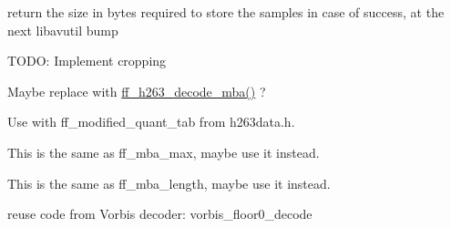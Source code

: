 
\begin{DoxyRefList}
\item[Member \mbox{\hyperlink{group__lavc__misc_ga66b44aad56fa22a78fb8916eb8cc0516}{avcodec\+\_\+fill\+\_\+audio\+\_\+frame}} (\mbox{\hyperlink{struct_a_v_frame}{A\+V\+Frame}} $\ast$frame, int nb\+\_\+channels, enum A\+V\+Sample\+Format sample\+\_\+fmt, const uint8\+\_\+t $\ast$buf, int buf\+\_\+size, int align)]\label{todo__todo000001}%
%
return the size in bytes required to store the samples in case of success, at the next libavutil bump  
\item[Member \mbox{\hyperlink{pgssubdec_8c_ad3cdafdb4e33460b2d08bef10abc42e0}{parse\+\_\+presentation\+\_\+segment}} (\mbox{\hyperlink{struct_a_v_codec_context}{A\+V\+Codec\+Context}} $\ast$avctx, const uint8\+\_\+t $\ast$buf, int buf\+\_\+size, int64\+\_\+t pts)]\label{todo__todo000002}%
%
T\+O\+DO\+: Implement cropping  
\item[Member \mbox{\hyperlink{rv34_8h_ad46c3fe33a6386b10a17c89a99503820}{ff\+\_\+rv34\+\_\+get\+\_\+start\+\_\+offset}} (\mbox{\hyperlink{struct_get_bit_context}{Get\+Bit\+Context}} $\ast$gb, int blocks)]\label{todo__todo000003}%
%
Maybe replace with \mbox{\hyperlink{h263_8h_a1eddcfd1eb8a27f9bc0edf7a227db7ea}{ff\+\_\+h263\+\_\+decode\+\_\+mba()}} ?  
\item[Member \mbox{\hyperlink{rv34data_8h_a86c4b6faa22c5ba0e3b16f3878bb8c33}{rv34\+\_\+dquant\+\_\+tab}} \mbox{[}2\mbox{]}\mbox{[}32\mbox{]}]\label{todo__todo000004}%
%
Use with ff\+\_\+modified\+\_\+quant\+\_\+tab from h263data.\+h.  
\item[Member \mbox{\hyperlink{rv34data_8h_add4342907e27f8b86afd06dcafe6a175}{rv34\+\_\+mb\+\_\+max\+\_\+sizes}} \mbox{[}6\mbox{]}]\label{todo__todo000005}%
%
This is the same as ff\+\_\+mba\+\_\+max, maybe use it instead.  
\item[Member \mbox{\hyperlink{rv34data_8h_ad329771d8171231707e603adea9767dc}{rv34\+\_\+mb\+\_\+bits\+\_\+sizes}} \mbox{[}6\mbox{]}]\label{todo__todo000006}%
%
This is the same as ff\+\_\+mba\+\_\+length, maybe use it instead.  
\item[Member \mbox{\hyperlink{twinvq_8c_ab4333cbf918588a5430e6ad0212cde4c}{eval\+\_\+lpc\+\_\+spectrum}} (const float $\ast$lsp, float cos\+\_\+val, int order)]\label{todo__todo000007}%
%
reuse code from Vorbis decoder\+: vorbis\+\_\+floor0\+\_\+decode  

\end{DoxyRefList}
